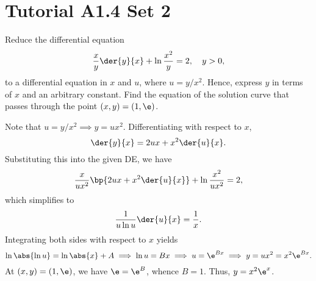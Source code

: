 \section{Tutorial A1.4 Set 2}

\begin{problem}
    Reduce the differential equation \[\frac{x}{y} \der{y}{x} + \ln \frac{x^2}{y} = 2, \quad y > 0,\] to a differential equation in $x$ and $u$, where $u = y/x^2$. Hence, express $y$ in terms of $x$ and an arbitrary constant. Find the equation of the solution curve that passes through the point $(x, y) = (1, \e)$.
\end{problem}
\begin{solution}
    Note that $u = y/x^2 \implies y = ux^2$. Differentiating with respect to $x$, \[\der{y}{x} = 2ux + x^2 \der{u}{x}.\] Substituting this into the given DE, we have \[\frac{x}{ux^2} \bp{2ux + x^2 \der{u}{x}} + \ln{\frac{x^2}{ux^2}} = 2,\] which simplifies to \[\frac1{u \ln u} \der{u}{x} = \frac1x.\] Integrating both sides with respect to $x$ yields \[\ln \abs{\ln u} = \ln \abs{x} + A \implies \ln u = Bx \implies u = \e^{Bx} \implies y = ux^2 = x^2 \e^{Bx}.\] At $(x, y) = (1, \e)$, we have $\e = \e^B$, whence $B = 1$. Thus, $y = x^2 \e^x$.
\end{solution}

